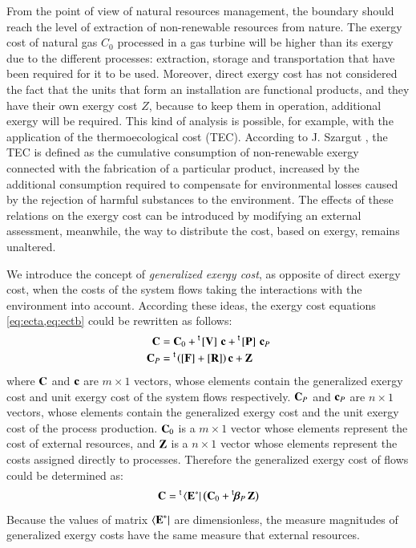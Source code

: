 \documentclass{ecos2018}
\begin{document}
From the point of view of natural resources management, the boundary should reach the level of extraction of non-renewable resources from nature. The exergy cost of natural gas $C_0$ processed in a gas turbine will be higher than its exergy due to the different processes: extraction, storage and transportation that have been required for it to be used.  Moreover, direct exergy cost has not considered the fact that the units that form an installation are functional products, and they have their own exergy cost $Z$, because to keep them in operation, additional exergy will be required.   
This kind of analysis is possible, for example, with the application of the thermoecological cost (TEC). According to J. Szargut \cite{Szargut2005}, the TEC is defined as the cumulative consumption of non-renewable exergy connected with the fabrication of a particular product, increased by the additional consumption required to compensate for environmental losses caused by the rejection of harmful substances to the environment. The effects of these relations on the exergy cost can be introduced by modifying an external assessment, meanwhile, the way to distribute the cost, based on exergy, remains unaltered.

We introduce the concept of \emph{generalized exergy cost}, as opposite of direct exergy cost, when the costs of the system flows taking the interactions with the environment into account.
According these ideas, the exergy cost equations \cref{eq:ecta,eq:ectb} could be rewritten as follows:
\begin{align}
\mathbf{C}&=\mathbf{C}_0+\prescript{\smash{\mathsf{t}}}{}{\mskip-1mu}\left[ \textbf{V} \right]\,\mathbf{c}+\prescript{\smash{\mathsf{t}}}{}{\mskip-1mu}\left[ \textbf{P} \right]\,\mathbf{c}_{P}\label{eq:gecta}\\
\mathbf{C}_{P}&=\prescript{\smash{\mathsf{t}}}{}{\mskip-1mu}\left([\mathbf{F}]+[\mathbf{R}]\right)\mathbf{c}+\mathbf{Z}\label{eq:gectb}
\end{align}
where $\mathbf{C}$ and $\mathbf{c}$ are $m\times 1$ vectors, whose elements contain the generalized exergy cost and unit exergy cost of the system flows respectively. $\mathbf{C}_{P}$ and $\mathbf{c}_{P}$ are $n \times1$ vectors, whose elements contain the generalized exergy cost and the unit exergy cost of the process production. $\mathbf{C}_0$ is a $m\times 1$ vector whose elements represent the cost of external resources, and $\mathbf{Z}$ is a $n\times 1$ vector whose elements represent the costs assigned directly to processes.
Therefore the generalized exergy cost of flows could be determined as:
\begin{equation}
\mathbf{C}=\prescript{\smash{\mathsf{t}}}{}{\mskip-1mu}\left\langle {\textbf{E}^\ast } \right|\left( \mathbf{C}_0 + \prescript{\smash{\mathsf{t}}}{}{\mskip-1mu}\bm{\beta}_P\,\mathbf{Z}\right )
\end{equation}
Because the values of matrix $\left\langle {\textbf{E}^\ast } \right|$ are dimensionless, the measure magnitudes of generalized exergy costs have the same measure that external resources.
\end{document}
